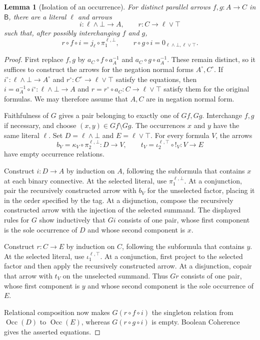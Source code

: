 \documentclass[11pt]{article}
\newtheorem{lemma}[theorem]{Lemma}
\newcommand{\B}{\mathsf B}
\newcommand{\Occ}{\operatorname{Occ}}
\begin{document}
\begin{lemma}[Isolation of an occurrence]\label{lem:isolation}
For distinct parallel arrows $f,g:A\to C$ in $\B$, there are a
literal $\ell$ and arrows
\[
 i:\ell\wedge\bot\longrightarrow A,
 \qquad r:C\longrightarrow\ell\vee\top
\]
such that, after possibly interchanging $f$ and $g$,
\[
 r\circ f\circ i=j_\ell\circ\pi_1^{\ell,\bot},
 \qquad
 r\circ g\circ i=0_{\ell\wedge\bot,\ell\vee\top}.
\]
\end{lemma}

\begin{proof}
First replace $f,g$ by $a_C\circ f\circ a_A^{-1}$ and
$a_C\circ g\circ a_A^{-1}$. These remain distinct, so it suffices to
construct the arrows for the negation normal forms $A^\circ,C^\circ$.
If
$i^\circ:\ell\wedge\bot\to A^\circ$ and
$r^\circ:C^\circ\to\ell\vee\top$ satisfy the equations,
then $i=a_A^{-1}\circ i^\circ:\ell\wedge\bot\to A$ and
$r=r^\circ\circ a_C:C\to\ell\vee\top$ satisfy them for the original
formulas.
We may therefore assume that $A,C$ are in negation normal form.

Faithfulness of $G$ gives a pair belonging to exactly one of $Gf,Gg$.
Interchange $f,g$ if necessary, and choose
$(x,y)\in Gf\setminus Gg$. The occurrences $x$ and $y$ have the same
literal $\ell$. Set $D=\ell\wedge\bot$ and $E=\ell\vee\top$.
For every formula $V$, the arrows
\[
 b_V=\kappa_V\circ\pi_2^{\ell,\bot}:D\to V,
 \qquad
 t_V=\iota_2^{\ell,\top}\circ!_V:V\to E
\]
have empty occurrence relations.

Construct $i:D\to A$ by induction on $A$, following the subformula
that contains $x$ at each binary connective. At the selected literal, use $\pi_1^{\ell,\bot}$.
At a conjunction, pair the recursively constructed arrow with $b_V$
for the unselected factor, placing it in the order specified by the
tag. At a disjunction, compose the recursively constructed arrow
with the injection of the selected summand. The displayed rules for
$G$ show inductively that $Gi$ consists of one pair, whose first component
is the sole occurrence of $D$ and whose second component is $x$.

Construct $r:C\to E$ by induction on $C$, following the subformula
that contains $y$.
At the selected literal, use $\iota_1^{\ell,\top}$.
At a conjunction, first project to the selected factor and then apply
the recursively constructed arrow. At a disjunction, copair that
arrow with $t_V$ on the unselected summand. Thus $Gr$ consists of one pair,
whose first component is $y$ and whose second component is the sole
occurrence of $E$.

Relational composition now makes $G(r\circ f\circ i)$ the singleton
relation from $\Occ(D)$ to $\Occ(E)$, whereas
$G(r\circ g\circ i)$ is empty. Boolean Coherence gives the asserted
equations.
\end{proof}
\end{document}

